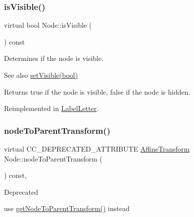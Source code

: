 \mbox{\label{classNode_a2595262a2b597f9d254ba6cfdae713c0}} 
\subsubsection{\texorpdfstring{is\+Visible()}{isVisible()}\hspace{0.1cm}{\footnotesize\ttfamily [2/2]}}
{\footnotesize\ttfamily virtual bool Node\+::is\+Visible (\begin{DoxyParamCaption}{ }\end{DoxyParamCaption}) const\hspace{0.3cm}{\ttfamily [virtual]}}

Determines if the node is visible.

\begin{DoxySeeAlso}{See also}
{\ttfamily \hyperlink{classNode_ad8d9f6f838941a2a8ae18420757af158}{set\+Visible(bool)}}
\end{DoxySeeAlso}
\begin{DoxyReturn}{Returns}
true if the node is visible, false if the node is hidden. 
\end{DoxyReturn}


Reimplemented in \hyperlink{classLabelLetter_a9f7187e6902a7b2a80ac3d2c5fc10523}{Label\+Letter}.

\mbox{\label{classNode_ab242ac36f0e26f5ef1f89e4a5fa4f02c}} 
\subsubsection{\texorpdfstring{node\+To\+Parent\+Transform()}{nodeToParentTransform()}\hspace{0.1cm}{\footnotesize\ttfamily [1/2]}}
{\footnotesize\ttfamily virtual C\+C\+\_\+\+D\+E\+P\+R\+E\+C\+A\+T\+E\+D\+\_\+\+A\+T\+T\+R\+I\+B\+U\+TE \hyperlink{structAffineTransform}{Affine\+Transform} Node\+::node\+To\+Parent\+Transform (\begin{DoxyParamCaption}{ }\end{DoxyParamCaption}) const\hspace{0.3cm}{\ttfamily [inline]}, {\ttfamily [virtual]}}

\begin{DoxyRefDesc}{Deprecated}
\item[\hyperlink{deprecated__deprecated000033}{Deprecated}]use \hyperlink{classNode_a7235b4a4d449fb7e01459c5c3b24d1eb}{get\+Node\+To\+Parent\+Transform()} instead \end{DoxyRefDesc}
\mbox{\label{classNode_ab242ac36f0e26f5ef1f89e4a5fa4f02c}} 
